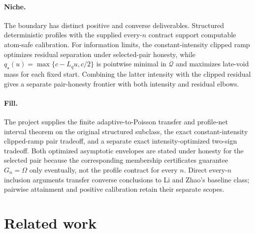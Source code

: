 \documentclass{article}
\begin{document}
\paragraph{Niche.} The boundary has distinct positive and converse deliverables. Structured deterministic profiles with the supplied every-\(n\) contract support computable atom-safe calibration. For information limits, the constant-intensity clipped ramp optimizes residual separation under selected-pair honesty, while \(q_\star(u)=\max\{c-L_qu,c/2\}\) is pointwise minimal in \(\mathcal Q\) and maximizes late-void mass for each fixed start. Combining the latter intensity with the clipped residual gives a separate pair-honesty frontier with both intensity and residual elbows.

\paragraph{Fill.} The project supplies the finite adaptive-to-Poisson transfer and profile-net interval theorem on the original structured subclass, the exact constant-intensity clipped-ramp pair tradeoff, and a separate exact intensity-optimized two-sign tradeoff. Both optimized asymptotic envelopes are stated under honesty for the selected pair because the corresponding membership certificates guarantee \(G_n=\Omega\) only eventually, not the profile contract for every \(n\). Direct every-\(n\) inclusion arguments transfer converse conclusions to Li and Zhao's baseline class; pairwise attainment and positive calibration retain their separate scopes.

\section{Related work}
\end{document}
